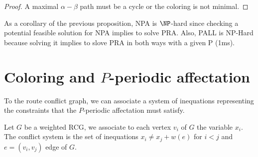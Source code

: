 \documentclass{article}
\begin{document}
{\begin{proof}
 A maximal $\alpha - \beta$ path must be a cycle or the coloring is not minimal.
\end{proof}




% 
% 
% 
% 
% 

As a corollary of the previous proposition, NPA is $\NP$-hard since checking a potential feasible solution for NPA implies to solve PRA.
Also, PALL is NP-Hard because solving it implies to slove PRA in both ways with a given P (1ms).




\section{Coloring and $P$-periodic affectation}

To the route conflict graph, we can associate a system of inequations representing the constraints that the 
$P$-periodic affectation must satisfy.

\begin{definition}
 Let $G$ be a weighted RCG, we associate to each vertex $v_i$ of $G$ the variable $x_i$.
 The conflict system is the set of inequations $ x_i \neq x_j + w(e)$ for $i < j$ and $e=(v_i,v_j)$ edge of $G$.
\end{definition}

}
\end{document}
